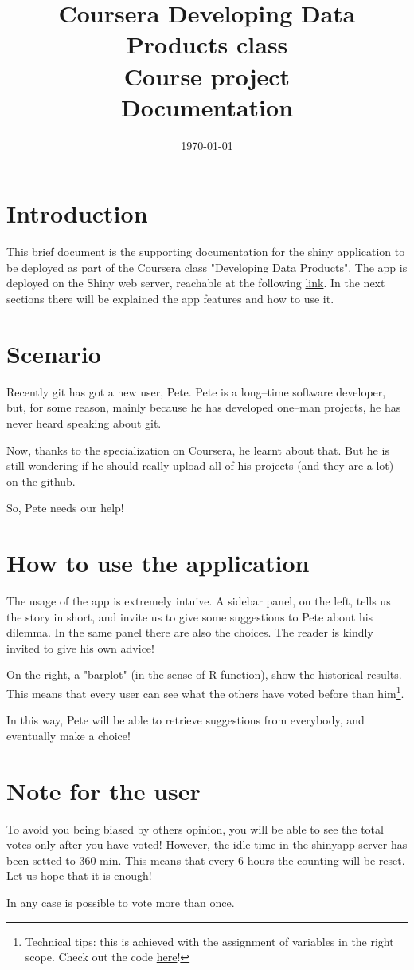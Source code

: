 \documentclass[a4paper,12pt]{article}
\title{Coursera Developing Data Products class\\ Course project\\Documentation}
\author{}
\date{\today}
\begin{document}
\maketitle

\section*{Introduction}
This brief document is the supporting documentation for the shiny application to be deployed as part of the Coursera class "Developing Data Products". The app is deployed on the Shiny web server, reachable at the following \href{https://pgrandinetti.shinyapps.io/shinyApp}{link}. In the next sections there will be explained the app features and how to use it.

\section*{Scenario}
Recently git has got a new user, Pete. Pete is a long--time software developer, but, for some reason, mainly because he has developed one--man projects, he has never heard speaking about git.

Now, thanks to the specialization on Coursera, he learnt about that. But he is still wondering if he should really upload all of his projects (and they are a lot) on the github.

So, Pete needs our help!

\section*{How to use the application}
The usage of the app is extremely intuive. A sidebar panel, on the left, tells us the story in short, and invite us to give some suggestions to Pete about his dilemma. In the same panel there are also the choices. The reader is kindly invited to give his own advice!

On the right, a "barplot" (in the sense of R function), show the historical results. This means that every user can see what the others have voted before than him\footnote{Technical tips: this is achieved with the assignment of variables in the right scope. Check out the code \href{https://github.com/pgrandinetti/dataproductclass}{here}!}.

In this way, Pete will be able to retrieve suggestions from everybody, and eventually make a choice!

\section*{Note for the user}
To avoid you being biased by others opinion, you will be able to see the total votes only after you have voted! However, the idle time in the shinyapp server has been setted to 360 min. This means that every 6 hours the counting will be reset. Let us hope that it is enough!

In any case is possible to vote more than once.
\end{document}
